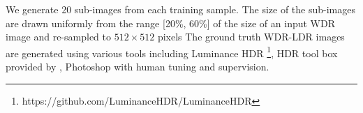 \documentclass[journal]{IEEEtran}
\begin{document}
We generate 20 sub-images from each training sample. 
The size of the sub-images are drawn uniformly from the range [20\%, 60\%] of the size of an input WDR image and re-sampled to $512 \times 512$ pixels 
The ground truth WDR-LDR images are generated using various tools including Luminance HDR \footnote{https://github.com/LuminanceHDR/LuminanceHDR}, HDR tool box provided by \cite{Banterle2017}, Photoshop with human tuning and supervision. 
\end{document}
